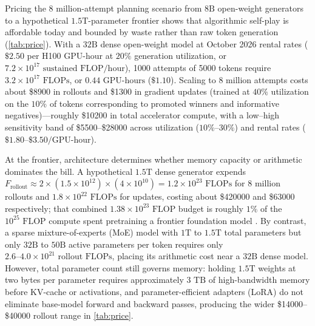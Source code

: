 Pricing the $8\text{ million}$-attempt planning scenario from $8\text{B}$ open-weight generators to a hypothetical $1.5\text{T}$-parameter frontier shows that algorithmic self-play is affordable today and bounded by waste rather than raw token generation (\cref{tab:price}). With a $32\text{B}$ dense open-weight model at October 2026 rental rates ($\$2.50$ per H100 GPU-hour at $20\%$ generation utilization, or $7.2 \times 10^{17}\text{ sustained FLOP/hour}$), \num{1000} attempts of \num{5000} tokens require $3.2 \times 10^{17}\text{ FLOPs}$, or $0.44\text{ GPU-hours}$ ($\$1.10$). Scaling to $8\text{ million}$ attempts costs about \$\num{8900} in rollouts and \$\num{1300} in gradient updates (trained at $40\%$ utilization on the $10\%$ of tokens corresponding to promoted winners and informative negatives)---roughly \$\num{10200} in total accelerator compute, with a low--high sensitivity band of \$\num{5500}--\$\num{28000} across utilization ($10\%\text{--}30\%$) and rental rates ($\$1.80\text{--}\$3.50/\text{GPU-hour}$).

At the frontier, architecture determines whether memory capacity or arithmetic dominates the bill. A hypothetical $1.5\text{T}$ dense generator expends $F_{\text{rollout}} \approx 2 \times (1.5 \times 10^{12}) \times (4 \times 10^{10}) = 1.2 \times 10^{23}\text{ FLOPs}$ for $8\text{ million}$ rollouts and $1.8 \times 10^{22}\text{ FLOPs}$ for updates, costing about \$\num{420000} and \$\num{63000} respectively; that combined $1.38 \times 10^{23}\text{ FLOP}$ budget is roughly $1\%$ of the $10^{25}\text{ FLOP}$ compute spent pretraining a frontier foundation model \citep{epoch2024data}. By contrast, a sparse mixture-of-experts (MoE) model with $1\text{T}$ to $1.5\text{T}$ total parameters but only $32\text{B}$ to $50\text{B}$ active parameters per token \citep{deepseekv3} requires only $2.6\text{--}4.0 \times 10^{21}\text{ rollout FLOPs}$, placing its arithmetic cost near a $32\text{B}$ dense model. However, total parameter count still governs memory: holding $1.5\text{T}$ weights at two bytes per parameter requires approximately $3\text{ TB}$ of high-bandwidth memory before KV-cache or activations, and parameter-efficient adapters (LoRA) do not eliminate base-model forward and backward passes, producing the wider \$\num{14000}--\$\num{40000} rollout range in \cref{tab:price}.


